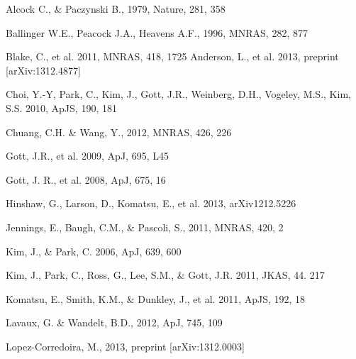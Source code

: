 \documentclass{emulateapj}
\begin{document}

\begin{thebibliography}{}


Alcock C., \& Paczynski B., 1979, Nature, 281, 358

Ballinger W.E., Peacock J.A., Heavens A.F., 1996, MNRAS, 282, 877

Blake, C., et al. 2011, MNRAS, 418, 1725
Anderson, L., et al. 2013, preprint [arXiv:1312.4877]

Choi, Y.-Y, Park, C., Kim, J., Gott, J.R., Weinberg, D.H., Vogeley, M.S., Kim, S.S. 2010, ApJS, 190, 181

Chuang, C.H. \& Wang, Y., 2012, MNRAS, 426, 226

Gott, J.R., et al. 2009, ApJ, 695, L45

Gott, J. R., et al. 2008, ApJ, 675, 16

Hinshaw, G., Larson, D., Komatsu, E., et al. 2013, arXiv1212.5226

Jennings, E., Baugh, C.M., \& Pascoli, S., 2011, MNRAS, 420, 2

Kim, J., \& Park, C. 2006, ApJ, 639, 600

Kim, J., Park, C., Ross, G., Lee, S.M., \& Gott, J.R. 2011, JKAS, 44. 217

Komatsu, E., Smith, K.M., \& Dunkley, J., et al. 2011, ApJS, 192, 18

Lavaux, G. \& Wandelt, B.D., 2012, ApJ, 745, 109


Lopez-Corredoira, M., 2013, preprint [arXiv:1312.0003]


\end{thebibliography}
\end{document}
